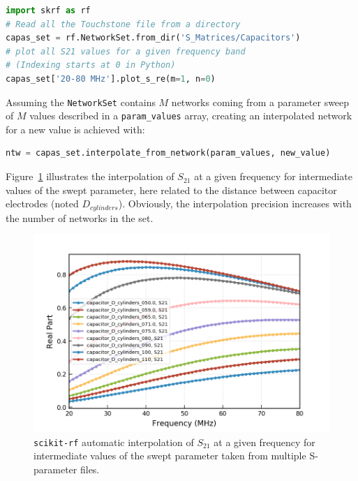 {\begin{lstlisting}[language=Python]
import skrf as rf
# Read all the Touchstone file from a directory
capas_set = rf.NetworkSet.from_dir('S_Matrices/Capacitors')
# plot all S21 values for a given frequency band
# (Indexing starts at 0 in Python)
capas_set['20-80 MHz'].plot_s_re(m=1, n=0)
\end{lstlisting}

Assuming the \texttt{NetworkSet} contains $M$ networks coming from a parameter sweep of $M$ values described in a \texttt{param\_values} array, creating an interpolated network for a new value is achieved with:

\begin{lstlisting}[language=Python]
ntw = capas_set.interpolate_from_network(param_values, new_value)\end{lstlisting}

Figure~\ref{fig:capassets21db} illustrates the interpolation of $S_{21}$ at a given frequency for intermediate values of the swept parameter, here related to the distance between capacitor electrodes (noted $D_{cylinders}$). Obviously, the interpolation precision increases with the number of networks in the set.

\begin{figure}
	\centering
	\includegraphics[width=1.0\linewidth]{figures/chap3/WEST_ICRH/capas_set_S21db}
	\caption{\texttt{scikit-rf} automatic interpolation of $S_{21}$ at a given frequency for intermediate values of the swept parameter taken from multiple S-parameter files. }
	\label{fig:capassets21db}
\end{figure}


}
